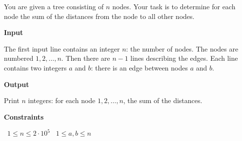 You are given a tree consisting of $n$ nodes.
Your task is to determine for each node the sum of the distances from the node to all other nodes.

\vspace{0.3cm}\noindent\textbf{Input}

The first input line contains an integer $n$: the number of nodes. The nodes are numbered $1,2,\ldots,n$.
Then there are $n-1$ lines describing the edges. Each line contains two integers $a$ and $b$: there is an edge between nodes $a$ and $b$.

\vspace{0.3cm}\noindent\textbf{Output}

Print $n$ integers: for each node $1,2,\ldots,n$, the sum of the distances.

\vspace{0.3cm}\noindent\textbf{Constraints}

\textbullet\ $1 \le n \le 2 \cdot 10^5$
\textbullet\ $1 \le a,b \le n$
